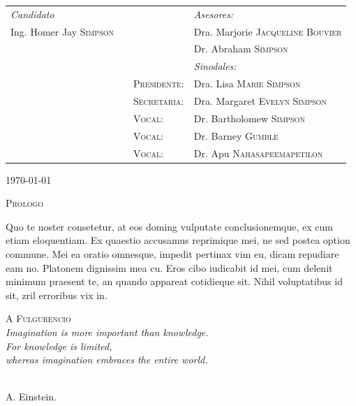 \begin{titlepage}
\begin{center}
	\vspace{1em}
	\begin{tabular}{lp{.2cm}ll}
		\textit{Candidato}
		  & 
		  & 
		  & \textit{Asesores:}\\
		Ing. Homer Jay \textsc{Simpson} 
		  &
		  &
		  & Dra. Marjorie \textsc{Jacqueline Bouvier}\\
		&
		  &
		  & Dr. Abraham \textsc{Simpson}\\[2em]
		&
		&
		& \textit{Sinodales:}\\
		&
		&\textsc{Presidente}:
		& Dra. Lisa \textsc{Marie Simpson}\\[2.5em]
		&
		&\textsc{Secretaria}:
		& Dra. Margaret \textsc{Evelyn Simpson}\\[2.5em]
		&
		&\textsc{Vocal}:
		& Dr. Bartholomew \textsc{Simpson}\\[2.5em]
		&
		&\textsc{Vocal}:
		& Dr. Barney \textsc{Gumble}\\[2.5em]
		&
		&\textsc{Vocal}:
		& Dr. Apu \textsc{Nahasapeemapetilon}\\
	\end{tabular}


	\vfill
	\begin{flushright}
		\normalsize\today
	\end{flushright}

\end{center}

\end{titlepage}

\blankpage

\textsc{\Large Prologo}

Quo te noster consetetur, at eos doming vulputate conclusionemque, ex cum etiam eloquentiam. Ex quaestio accusamus reprimique mei, ne sed postea option commune. Mei ea oratio omnesque, impedit pertinax vim eu, dicam repudiare eam no. Platonem dignissim mea cu. Eros cibo iudicabit id mei, cum delenit minimum praesent te, an quando appareat cotidieque sit. Nihil voluptatibus id sit, zril erroribus vix in.

\vfill
\pagebreak

\begin{flushright}
	\begin{minipage}{.55\textwidth}
	\vspace{8em}
	{\large\textsc{A Fulgurencio}}\\[.5em]	
	\textit{Imagination is more important than knowledge.\\ For knowledge is limited, \\whereas imagination embraces the entire world.}
	\end{minipage}\\[1em]
	A. Einstein.
\end{flushright}
\vfill
\pagebreak

